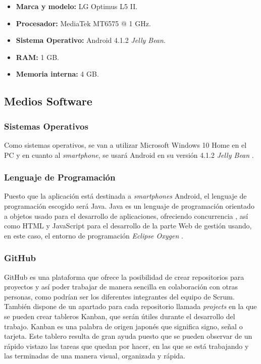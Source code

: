 \documentclass{pre-tfg}
\begin{document}
\begin{itemize}
	\item \textbf{Marca y modelo:} LG Optimus L5 II.
	\item \textbf{Procesador:} MediaTek MT6575 @ 1 GHz.
	\item \textbf{Sistema Operativo:} Android 4.1.2 \textit{Jelly Bean}.
	\item \textbf{RAM:} 1 GB.
	\item \textbf{Memoria interna:} 4 GB.
\end{itemize}

\subsection{Medios Software}

\subsubsection*{Sistemas Operativos}
Como sistemas operativos, se van a utilizar Microsoft Windows 10 Home \cite{Microsoft} en el PC y en cuanto al \textit{smartphone}, se usará Android en su versión 4.1.2 \textit{Jelly Bean} \cite{Andro}.

\subsubsection*{Lenguaje de Programación}
Puesto que la aplicación está destinada a \textit{smartphones} Android, el lenguaje de programación escogido será Java. Java es un lenguaje de programación orientado a objetos usado para el desarrollo de aplicaciones, ofreciendo concurrencia \cite{Java}, así como HTML y JavaScript para el desarrollo de la parte Web de gestión usando, en este caso, el entorno de programación \textit{Eclipse Oxygen} \cite{EclipseFoundation2018}.

\clearpage

\subsubsection*{GitHub}
GitHub es una plataforma que ofrece la posibilidad de crear repositorios para proyectos y así poder trabajar de manera sencilla en colaboración con otras personas, como podrían ser los diferentes integrantes del equipo de Scrum. También dispone de un apartado para cada repositorio llamada \textit{projects} en la que se pueden crear tableros Kanban, que serán útiles durante el desarrollo del trabajo. Kanban \cite{Gomez2017} es una palabra de origen japonés que significa signo, señal o tarjeta. Este tablero resulta de gran ayuda puesto que se pueden observar de un rápido vistazo las tareas que quedan por hacer, en las que se está trabajando y las terminadas de una manera visual, organizada y rápida.
\end{document}
